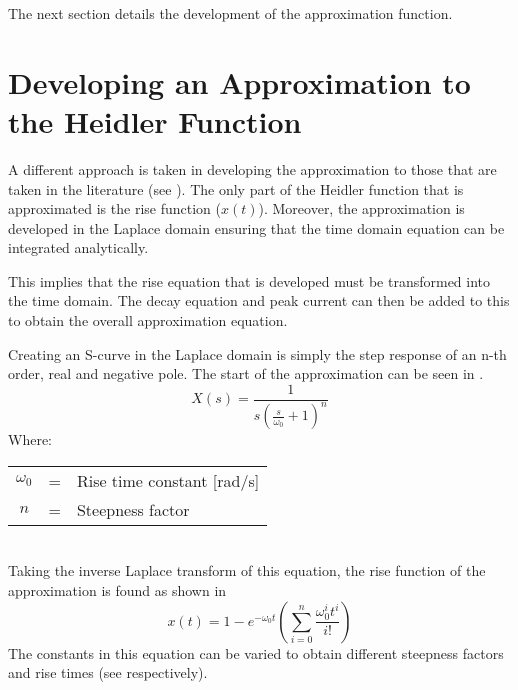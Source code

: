 The next section details the development of the approximation function.


\section{Developing an Approximation to the Heidler Function}
\label{sec:approx_methodology}
A different approach is taken in developing the approximation to those that are taken in the literature (see ). The only part of the Heidler function that is approximated is the rise function ($x(t)$). Moreover, the approximation is developed in the Laplace domain ensuring that the time domain equation can be integrated analytically.

This implies that the rise equation that is developed must be transformed into the time domain. The decay equation and peak current can then be added to this to obtain the overall approximation equation.

Creating an S-curve in the Laplace domain is simply the step response of an n-th order, real and negative pole. The start of the approximation can be seen in . 
\begin{equation}
    X(s) = \frac{1}{s \left ( \frac{s}{\omega_0} +1 \right )^n}
    \label{eqn:approxRiseLaplace}
\end{equation}
Where: \\
\begin{tabular}{cll}
    $\omega_0$ & = & Rise time constant [rad/s] \\
    $n$ & = & Steepness factor
\end{tabular}\\

Taking the inverse Laplace transform of this equation, the rise function of the approximation is found as shown in 
\begin{equation}
    x(t) = 1 - e^{-\omega_0 t} \left ( \sum\limits_{i=0}^n \frac{\omega_0^i t^i}{i!} \right )
    \label{eqn:approxRise}
\end{equation}
The constants in this equation can be varied to obtain different steepness factors and rise times (see  respectively).

